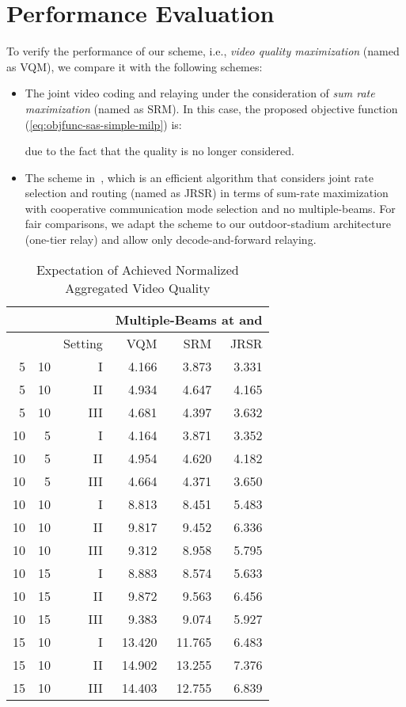 \documentclass[conference]{IEEEtran}
\begin{document}
\section{Performance Evaluation}\label{sec:perfeval}

To verify the performance of our scheme, i.e., \textit{video quality maximization} (named as \textsf{VQM}), we compare it with the following schemes:
\begin{itemize}
\item The joint video coding and relaying under the consideration of {\it sum rate maximization} (named as \textsf{SRM}). In this case, the proposed objective function (\ref{eq:objfunc-sas-simple-milp}) is:

due to the fact that the quality is no longer considered.
\item The scheme in~\cite{jsac12thou}, which is an efficient algorithm that considers joint rate selection and routing (named as \textsf{JRSR}) in terms of sum-rate maximization with cooperative communication mode selection and no multiple-beams.
For fair comparisons, we adapt the scheme to our outdoor-stadium architecture (one-tier relay) and allow only decode-and-forward relaying.
\end{itemize}

\begin{table}[tp]\caption{Expectation of Achieved Normalized Aggregated Video Quality}
\label{expectation}
\centering \begin{tabular}{r|r|r||r|r|r}
\hline
\multicolumn{3}{c||}{}&\multicolumn{3}{c}{Multiple-Beams at  and } \\
\hline
 &  & Setting & \textsf{VQM} & \textsf{SRM} & \textsf{JRSR}\\
\hline
\hline
5 & 10 &   I & 4.166 & 3.873 & 3.331 \\
5 & 10 &  II & 4.934 & 4.647 & 4.165 \\
5 & 10 & III & 4.681 & 4.397 & 3.632 \\
\hline
10 & 5 &   I & 4.164 & 3.871 & 3.352 \\
10 & 5 &  II & 4.954 & 4.620 & 4.182 \\
10 & 5 & III & 4.664 & 4.371 & 3.650 \\
\hline
10 & 10 &   I & 8.813 & 8.451 & 5.483 \\
10 & 10 &  II & 9.817 & 9.452 & 6.336 \\
10 & 10 & III & 9.312 & 8.958 & 5.795 \\
\hline
10 & 15 &   I & 8.883 & 8.574 & 5.633 \\
10 & 15 &  II & 9.872 & 9.563 & 6.456 \\
10 & 15 & III & 9.383 & 9.074 & 5.927 \\
\hline
15 & 10 &   I & 13.420 & 11.765 & 6.483 \\
15 & 10 &  II & 14.902 & 13.255 & 7.376 \\
15 & 10 & III & 14.403 & 12.755 & 6.839 \\
\hline
\end{tabular}
\end{table}
\end{document}
